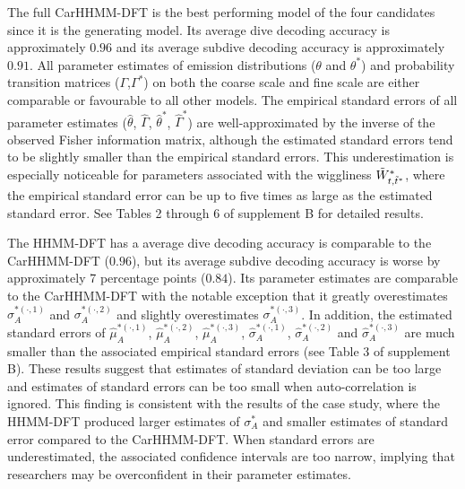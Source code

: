 The full CarHHMM-DFT is the best performing model of the four candidates since it is the generating model. Its average dive decoding accuracy is approximately $0.96$ and its average subdive decoding accuracy is approximately $0.91$. 
All parameter estimates of emission distributions ($\theta$ and $\theta^*$) and probability transition matrices ($\Gamma$,$\Gamma^*$) on both the coarse scale and fine scale are either comparable or favourable to all other models. The empirical standard errors of all parameter estimates ($\hat \theta$, $\hat \Gamma$, $\hat \theta^*$, $\hat \Gamma^*$) are well-approximated by the inverse of the observed Fisher information matrix, although the estimated standard errors tend to be slightly smaller than the empirical standard errors. This underestimation is especially noticeable for parameters associated with the wiggliness $\tilde{W}^*_{t,\tilde t^*}$, where the empirical standard error can be up to five times as large as the estimated standard error. See Tables 2 through 6 of supplement B for detailed results.

The HHMM-DFT has a average dive decoding accuracy is comparable to the CarHHMM-DFT ($0.96$), but its average subdive decoding accuracy is worse by approximately 7 percentage points ($0.84$). Its parameter estimates are comparable to the CarHHMM-DFT with the notable exception that it greatly overestimates $\sigma_A^{*(\cdot,1)}$ and $\sigma_A^{*(\cdot,2)}$ and slightly overestimates $\sigma_A^{*(\cdot,3)}$. In addition, the estimated standard errors of $\hat \mu_A^{*(\cdot,1)}$, $\hat \mu_A^{*(\cdot,2)}$, $\hat \mu_A^{*(\cdot,3)}$, $\hat \sigma_A^{*(\cdot,1)}$, $\hat \sigma_A^{*(\cdot,2)}$ and $\hat \sigma_A^{*(\cdot,3)}$ are much smaller than the associated empirical standard errors (see Table 3 of supplement B). These results suggest that estimates of standard deviation can be too large and estimates of standard errors can be too small when auto-correlation is ignored. This finding is consistent with the results of the case study, where the HHMM-DFT produced larger estimates of $\sigma_A^*$ and smaller estimates of standard error compared to the CarHHMM-DFT. When standard errors are underestimated, the associated confidence intervals are too narrow, implying that researchers may be overconfident in their parameter estimates.


